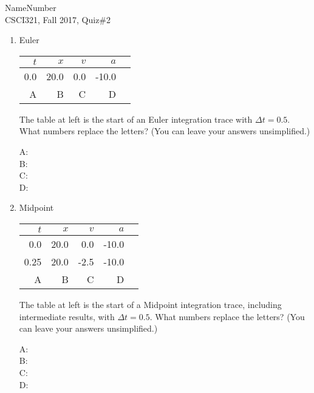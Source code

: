 \documentclass{article}
\begin{document}
Name\hrulefill Number \hrulefill \\
CSCI321, Fall 2017, Quiz\#2

\begin{enumerate}

  \item Euler

    \begin{minipage}{0.3\textwidth}
      \begin{tabular}{r|rrrr}
$t$ & $x$ & $v$ & $a$ \\\hline
0.0  &  20.0  &  0.0  &  -10.0  &  \\
A & B & C & D
\end{tabular}
    \end{minipage}\hfill
    \begin{minipage}{0.65\textwidth}
The table at left is the start of an Euler integration trace
with $\Delta t = 0.5$. What numbers replace the letters?  (You can
leave your answers unsimplified.)
    \end{minipage}
    
\begin{description}
\item[A:]\vfill\item[B:]\vfill\item[C:]\vfill\item[D:]\vfill
\end{description}


\item Midpoint

      \begin{minipage}{0.3\textwidth}
\begin{tabular}{r|rrrr}
$t$ & $x$ & $v$ & $a$ \\\hline
0.0  &  20.0  &  0.0  &  -10.0  &  \\
0.25  &  20.0  &  -2.5  &  -10.0  &  \\
A & B & C & D
\end{tabular}
    \end{minipage}\hfill
    \begin{minipage}{0.65\textwidth}
      The table at left is the start of a Midpoint integration trace,
      including intermediate results,
with $\Delta t = 0.5$. What numbers replace the letters? (You can
leave your answers unsimplified.)
\end{minipage}

\begin{description}
\item[A:]\vfill\item[B:]\vfill\item[C:]\vfill\item[D:]\vfill
\end{description}



\end{enumerate}
\end{document}
